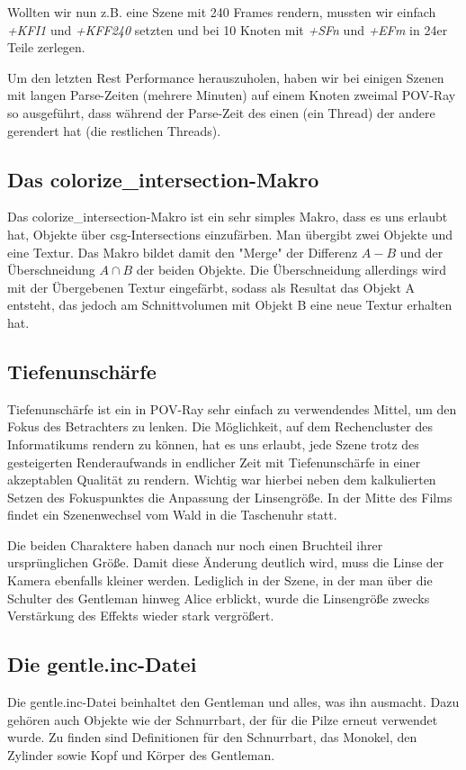 \documentclass[twocolumn]{article}
\begin{document}
Wollten wir nun z.B. eine Szene mit 240 Frames rendern, mussten wir einfach \textit{+KFI1} und \textit{+KFF240} setzten und bei 10 Knoten mit \textit{+SFn} und \textit{+EFm} in 24er Teile zerlegen.
 

Um den letzten Rest Performance herauszuholen, haben wir bei einigen Szenen mit langen Parse-Zeiten (mehrere Minuten) auf einem Knoten zweimal POV-Ray so ausgeführt, dass während der Parse-Zeit des einen (ein Thread) der andere gerendert hat (die restlichen Threads).

\subsection{Das colorize\_intersection-Makro}
Das colorize\_intersection-Makro ist ein sehr simples Makro, dass es uns erlaubt hat, Objekte über csg-Intersections einzufärben.
Man übergibt zwei Objekte und eine Textur. Das Makro bildet damit den "Merge" der Differenz $A - B$ und der Überschneidung $A \cap B$ der beiden Objekte.
Die Überschneidung allerdings wird mit der Übergebenen Textur eingefärbt, sodass als Resultat das Objekt A entsteht, das jedoch am Schnittvolumen mit Objekt B eine neue Textur erhalten hat.

\subsection{Tiefenunschärfe}
Tiefenunschärfe ist ein in POV-Ray sehr einfach zu verwendendes Mittel, um den Fokus des Betrachters zu lenken.
Die Möglichkeit, auf dem Rechencluster des Informatikums rendern zu können, hat es uns erlaubt, jede Szene trotz des gesteigerten Renderaufwands in endlicher Zeit mit Tiefenunschärfe in einer akzeptablen Qualität zu rendern.
Wichtig war hierbei neben dem kalkulierten Setzen des Fokuspunktes die Anpassung der Linsengröße.
In der Mitte des Films findet ein Szenenwechsel vom Wald in die Taschenuhr statt.

Die beiden Charaktere haben danach nur noch einen Bruchteil ihrer ursprünglichen Größe. Damit diese Änderung deutlich wird, muss die Linse der Kamera ebenfalls kleiner werden.
Lediglich in der Szene, in der man über die Schulter des Gentleman hinweg Alice erblickt, wurde die Linsengröße zwecks Verstärkung des Effekts wieder stark vergrößert.

\subsection{Die gentle.inc-Datei} %
Die gentle.inc-Datei beinhaltet den Gentleman und alles, was ihn ausmacht. Dazu gehören auch Objekte wie der Schnurrbart, der für die Pilze erneut verwendet wurde.
Zu finden sind Definitionen für den Schnurrbart, das Monokel, den Zylinder sowie Kopf und Körper des Gentleman.
\end{document}
